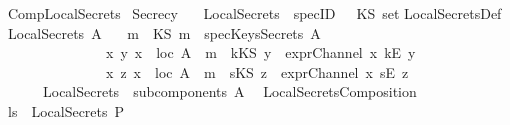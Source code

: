 %
\begin{isabellebody}%
\def\isabellecontext{CompLocalSecrets}%
%
\isamarkuptrue%
%
\isadelimtheory
%
\endisadelimtheory
%
\isatagtheory
{}\isamarkupfalse%
\ CompLocalSecrets\isanewline
{}\ Secrecy\ \isanewline
{}\isanewline
\isanewline
%
\isanewline
%
\isanewline
%
%
\endisatagtheory
{\isafoldtheory}%
%
\isadelimtheory
%
\endisadelimtheory
\isanewline
{}\isamarkupfalse%
\isanewline
\ \ LocalSecrets\ {\isacharcolon}{\isacharcolon}\ {\isachardoublequoteopen}specID\ \ {\isasymRightarrow}\ KS\ set{\isachardoublequoteclose}\isanewline
{}\isanewline
LocalSecretsDef{\isacharcolon}\isanewline
\ {\isachardoublequoteopen}LocalSecrets\ A\ {\isacharequal}\isanewline
\ \ {\isacharbraceleft}{\isacharparenleft}m\ {\isacharcolon}{\isacharcolon}\ KS{\isacharparenright}{\isachardot}\ m\ {\isasymnotin}\ specKeysSecrets\ A\ \ {\isasymand}\ \isanewline
\ \ \ \ \ \ \ \ \ \ \ \ \ \ {\isacharparenleft}{\isacharparenleft}{\isasymexists}\ x\ y{\isachardot}\ {\isacharparenleft}{\isacharparenleft}x\ {\isasymin}\ loc\ A{\isacharparenright}\ {\isasymand}\ m\ {\isacharequal}\ {\isacharparenleft}kKS\ y{\isacharparenright}\ {\isasymand}\ {\isacharparenleft}exprChannel\ x\ {\isacharparenleft}kE\ y{\isacharparenright}{\isacharparenright}{\isacharparenright}{\isacharparenright}\ \isanewline
\ \ \ \ \ \ \ \ \ \ \ \ \ \ {\isacharbar}{\isacharparenleft}{\isasymexists}\ x\ z{\isachardot}\ {\isacharparenleft}{\isacharparenleft}x\ {\isasymin}\ loc\ A{\isacharparenright}\ {\isasymand}\ m\ {\isacharequal}\ {\isacharparenleft}sKS\ z{\isacharparenright}\ {\isasymand}\ {\isacharparenleft}exprChannel\ x\ {\isacharparenleft}sE\ z{\isacharparenright}{\isacharparenright}\ {\isacharparenright}{\isacharparenright}\ {\isacharparenright}{\isacharbraceright}\ \isanewline
\ \ \ {\isasymunion}\ \ {\isacharparenleft}{\isasymUnion}\ {\isacharparenleft}LocalSecrets\ {\isacharbackquote}\ {\isacharparenleft}subcomponents\ A{\isacharparenright}\ {\isacharparenright}{\isacharparenright}{\isachardoublequoteclose}\isanewline
\isanewline
{}\isamarkupfalse%
\ LocalSecretsComposition{}{\isacharcolon}\isanewline
{}\ {\isachardoublequoteopen}ls\ {\isasymin}\ LocalSecrets\ P{\isachardoublequoteclose}\isanewline

\end{isabellebody}

